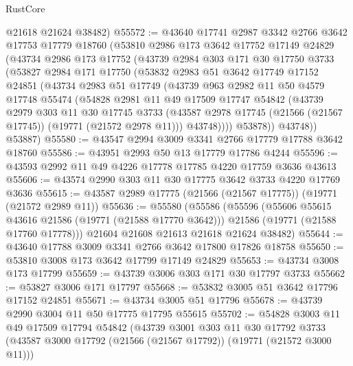 \begin{lexlean}{RustCore}
\begin{coremodule}
      @21618
      @21624
      @38482)
@55572 := @43640
    @17741
    @2987
    @3342
    @2766
    @3642
    @17753
    @17779
    @18760
    (@53810
      @2986
      @173
      @3642
      @17752
      @17149
      @24829
      (@43734
        @2986
        @173
        @17752
        (@43739
          @2984
          @303
          @171
          @30
          @17750
          @3733
          (@53827
            @2984
            @171
            @17750
            (@53832
              @2983
              @51
              @3642
              @17749
              @17152
              @24851
              (@43734
                @2983
                @51
                @17749
                (@43739
                  @963
                  @2982
                  @11
                  @50
                  @4579
                  @17748
                  @55474
                  (@54828
                    @2981
                    @11
                    @49
                    @17509
                    @17747
                    @54842
                    (@43739
                      @2979
                      @303
                      @11
                      @30
                      @17745
                      @3733
                      (@43587 @2978 @17745 (@21566 (@21567 @17745)) (@19771 (@21572 @2978 @11)))
                      @43748))))
              @53878))
          @43748))
      @53887)
@55580 := @43547 @2994 @3009 @3341 @2766 @17779 @17788 @3642 @18760
@55586 := @43951 @2993 @50 @13 @17779 @17786 @4244
@55596 := @43593 @2992 @11 @49 @4226 @17778 @17785 @4220 @17759 @3636 @43613
@55606 := @43574 @2990 @303 @11 @30 @17775 @3642 @3733 @4220 @17769 @3636
@55615 := @43587 @2989 @17775 (@21566 (@21567 @17775)) (@19771 (@21572 @2989 @11))
@55636 := @55580
    (@55586
      (@55596
        (@55606 @55615 @43616 @21586 (@19771 (@21588 @17770 @3642)))
        @21586
        (@19771 (@21588 @17760 @17778)))
      @21604
      @21608
      @21613
      @21618
      @21624
      @38482)
@55644 := @43640 @17788 @3009 @3341 @2766 @3642 @17800 @17826 @18758
@55650 := @53810 @3008 @173 @3642 @17799 @17149 @24829
@55653 := @43734 @3008 @173 @17799
@55659 := @43739 @3006 @303 @171 @30 @17797 @3733
@55662 := @53827 @3006 @171 @17797
@55668 := @53832 @3005 @51 @3642 @17796 @17152 @24851
@55671 := @43734 @3005 @51 @17796
@55678 := @43739 @2990 @3004 @11 @50 @17775 @17795 @55615
@55702 := @54828
    @3003
    @11
    @49
    @17509
    @17794
    @54842
    (@43739
      @3001
      @303
      @11
      @30
      @17792
      @3733
      (@43587 @3000 @17792 (@21566 (@21567 @17792)) (@19771 (@21572 @3000 @11)))

\end{coremodule}
\end{lexlean}

